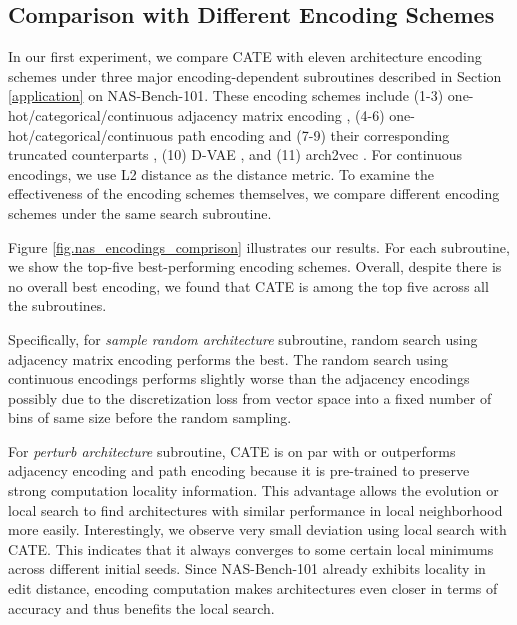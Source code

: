 \subsection{Comparison with Different Encoding Schemes} \label{enc:comp}
In our first experiment, we compare CATE with eleven architecture encoding schemes under three major encoding-dependent subroutines described in Section \ref{application} on NAS-Bench-101.
These encoding schemes include (1-3) one-hot/categorical/continuous adjacency matrix encoding  \cite{pmlr-v97-ying19a},  (4-6) one-hot/categorical/continuous path encoding and (7-9) their corresponding truncated counterparts \cite{white2019bananas}, (10) D-VAE \cite{zhang2019d}, and (11) arch2vec \cite{yan2020arch}. For continuous encodings, we use L2 distance as the distance metric. To examine the effectiveness of the encoding schemes themselves, we compare different encoding schemes under the same search subroutine. 

Figure \ref{fig.nas_encodings_comprison} illustrates our results. For each subroutine, we show the top-five best-performing encoding schemes. Overall, despite there is no overall best encoding, we found that CATE is among the top five across all the subroutines.

Specifically, for \emph{sample random architecture} subroutine, random search using adjacency matrix encoding performs the best. 
The random search using continuous encodings performs slightly worse than the adjacency encodings possibly due to the discretization loss from vector space into a fixed number of bins of same size before the random sampling. 

For \emph{perturb architecture} subroutine, CATE is on par with or outperforms adjacency encoding and path encoding because it is pre-trained to preserve strong computation locality information. This advantage allows the evolution or local search to find architectures with similar performance in local neighborhood more easily. Interestingly, we observe very small deviation using local search with CATE. This indicates that it always converges to some certain local minimums across different initial seeds. Since NAS-Bench-101 already exhibits locality in edit distance, encoding computation makes architectures even closer in terms of accuracy and thus benefits the local search. 

